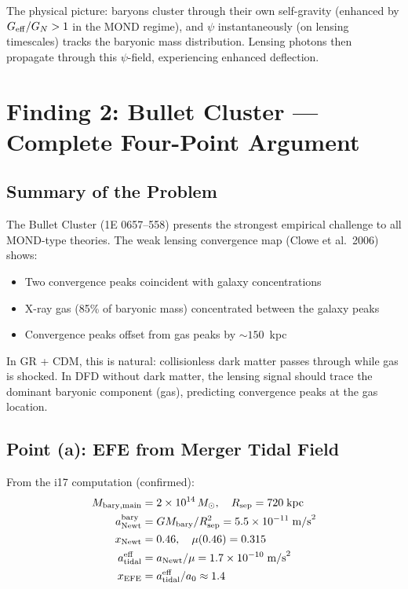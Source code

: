 \documentclass[11pt,a4paper]{article}
\newcommand{\Geff}{G_{\rm eff}}
\newcommand{\ee}[1]{\times 10^{#1}}
\begin{document}
The physical picture: baryons cluster through their own self-gravity (enhanced
by $\Geff/G_N > 1$ in the MOND regime), and $\psi$ instantaneously (on
lensing timescales) tracks the baryonic mass distribution.  Lensing photons
then propagate through this $\psi$-field, experiencing enhanced deflection.


\section{Finding 2: Bullet Cluster --- Complete Four-Point Argument}
\label{sec:bullet-full}

\subsection{Summary of the Problem}

The Bullet Cluster (1E 0657--558) presents the strongest empirical challenge
to all MOND-type theories.  The weak lensing convergence map (Clowe et al.\
2006) shows:
\begin{itemize}
\item Two convergence peaks coincident with galaxy concentrations
\item X-ray gas (85\% of baryonic mass) concentrated between the
  galaxy peaks
\item Convergence peaks offset from gas peaks by $\sim 150$~kpc
\end{itemize}

In GR + CDM, this is natural: collisionless dark matter passes through while
gas is shocked.  In DFD without dark matter, the lensing signal should trace
the dominant baryonic component (gas), predicting convergence peaks at the
gas location.

\subsection{Point (a): EFE from Merger Tidal Field}

From the i17 computation (confirmed):
\begin{align}
M_{\rm bary,main} &= 2 \times 10^{14}\,M_\odot, \quad R_{\rm sep} = 720\;\text{kpc} \\
a_{\rm Newt}^{\rm bary} &= GM_{\rm bary}/R_{\rm sep}^2 = 5.5\ee{-11}\;\text{m/s}^2 \\
x_{\rm Newt} &= 0.46, \quad \mu(0.46) = 0.315 \\
a_{\rm tidal}^{\rm eff} &= a_{\rm Newt}/\mu = 1.7\ee{-10}\;\text{m/s}^2 \\
x_{\rm EFE} &= a_{\rm tidal}^{\rm eff}/a_0 \approx 1.4
\end{align}
\end{document}
